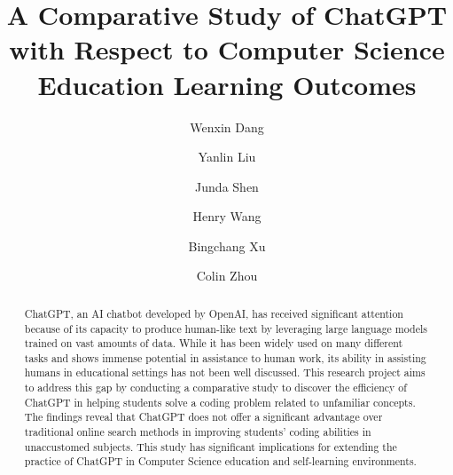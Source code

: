 \documentclass[manuscript,screen,nonacm]{acmart}
\begin{document}
\title{A Comparative Study of ChatGPT with Respect to Computer Science Education Learning Outcomes}

\author{Wenxin Dang}
\author{Yanlin Liu}
\authornotemark[1]
\author{Junda Shen}
\authornotemark[1]
\author{Henry Wang}
\authornotemark[1]
\author{Bingchang Xu}
\authornotemark[1]
\author{Colin Zhou}
\authornotemark[1]



\renewcommand{\shortauthors}{Team 12}

\begin{abstract}
ChatGPT, an AI chatbot developed by OpenAI, has received significant attention because of its capacity to produce human-like text by leveraging large language models trained on vast amounts of data. While it has been widely used on many different tasks and shows immense potential in assistance to human work, its ability in assisting humans in educational settings has not been well discussed. This research project aims to address this gap by conducting a comparative study to discover the efficiency of ChatGPT in helping students solve a coding problem related to unfamiliar concepts. The findings reveal that ChatGPT does not offer a significant advantage over traditional online search methods in improving students' coding abilities in unaccustomed subjects. This study has significant implications for extending the practice of ChatGPT in Computer Science education and self-learning environments.
\end{abstract}
\end{document}
